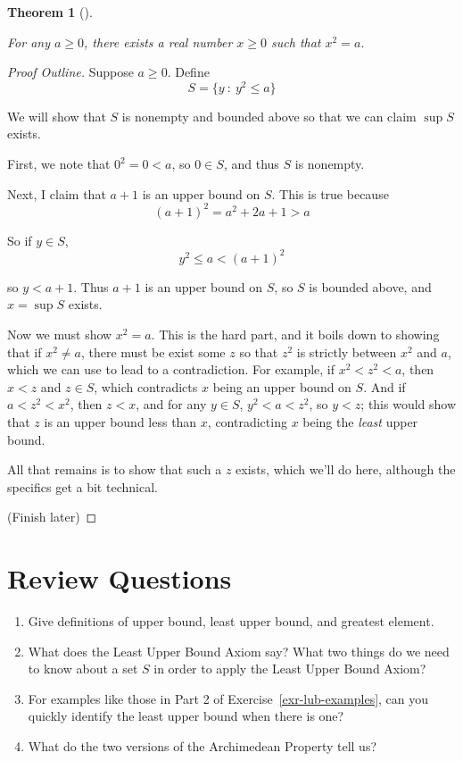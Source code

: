 \documentclass[
  letterpaper,
  DIV=11,
  numbers=noendperiod]{scrreprt}
\providecommand{\tightlist}{%
  \setlength{\itemsep}{0pt}\setlength{\parskip}{0pt}}
\newcommand{\st}{~:~}
\theoremstyle{plain}
\newtheorem{theorem}{Theorem}[chapter]
\theoremstyle{definition}
\theoremstyle{plain}
\theoremstyle{plain}
\theoremstyle{definition}
\theoremstyle{definition}
\theoremstyle{remark}
\begin{document}
\begin{theorem}[]\protect\hypertarget{thm-sqrts-exist}{}\label{thm-sqrts-exist}

For any \(a\geq 0\), there exists a real number \(x\geq 0\) such that
\(x^2=a\).

\end{theorem}

\begin{proof}[Proof Outline]
Suppose \(a\geq 0\). Define \[S=\{y\st y^2\leq a\}\]

We will show that \(S\) is nonempty and bounded above so that we can
claim \(\sup S\) exists.

First, we note that \(0^2=0<a\), so \(0\in S\), and thus \(S\) is
nonempty.

Next, I claim that \(a+1\) is an upper bound on \(S\). This is true
because \[(a+1)^2=a^2+2a+1>a\]

So if \(y\in S\), \[y^2\leq a< (a+1)^2\]

so \(y<a+1\). Thus \(a+1\) is an upper bound on \(S\), so \(S\) is
bounded above, and \(x=\sup S\) exists.

Now we must show \(x^2=a\). This is the hard part, and it boils down to
showing that if \(x^2\neq a\), there must be exist some \(z\) so that
\(z^2\) is strictly between \(x^2\) and \(a\), which we can use to lead
to a contradiction. For example, if \(x^2<z^2<a\), then \(x<z\) and
\(z\in S\), which contradicts \(x\) being an upper bound on \(S\). And
if \(a<z^2<x^2\), then \(z<x\), and for any \(y\in S\), \(y^2<a<z^2\),
so \(y<z\); this would show that \(z\) is an upper bound less than
\(x\), contradicting \(x\) being the \emph{least} upper bound.

All that remains is to show that such a \(z\) exists, which we'll do
here, although the specifics get a bit technical.

(Finish later)
\end{proof}

\section{Review Questions}\label{review-questions-1}

\begin{enumerate}
\def\labelenumi{\arabic{enumi}.}
\tightlist
\item
  Give definitions of upper bound, least upper bound, and greatest
  element.
\item
  What does the Least Upper Bound Axiom say? What two things do we need
  to know about a set \(S\) in order to apply the Least Upper Bound
  Axiom?
\item
  For examples like those in Part 2 of Exercise~\ref{exr-lub-examples},
  can you quickly identify the least upper bound when there is one?
\item
  What do the two versions of the Archimedean Property tell us?
\end{enumerate}
\end{document}
